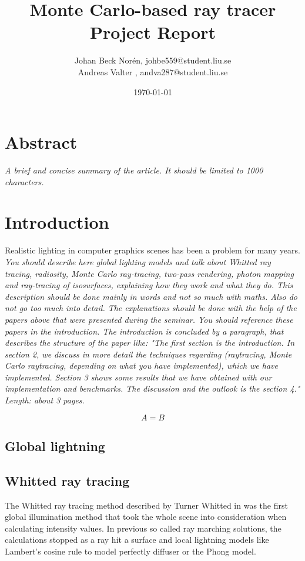 \documentclass[]{report}   %
\begin{document}
\title{Monte Carlo-based ray tracer\\ Project Report}   %
\author{
	Johan Beck Nor\'{e}n, johbe559@student.liu.se
	\\Andreas Valter , andva287@student.liu.se
	}
\date{\today}    %
\maketitle

\setcounter{page}{2}
\chapter{Abstract}
\emph{ A brief and concise summary of the article. It should be limited to 1000 characters.}
\chapter{Introduction}
Realistic lighting in computer graphics scenes has been a problem for many years.
\emph{You should describe here global lighting models and talk about Whitted ray tracing, radiosity, Monte Carlo ray-tracing, two-pass rendering, photon mapping and ray-tracing of isosurfaces, explaining how they work and what they do. 
This description should be done mainly in words and not so much with maths. 
Also do not go too much into detail. 
The explanations should be done with the help of the papers above that were presented during the seminar. 
You should reference these papers in the introduction. 
The introduction is concluded by a paragraph, that describes the structure of the paper like: "The first section is the introduction. 
In section 2, we discuss in more detail the techniques regarding (raytracing, Monte Carlo raytracing, depending on what you have implemented), which we have implemented. 
Section 3 shows some results that we have obtained with our implementation and benchmarks. 
The discussion and the outlook is the section 4." 
Length: about 3 pages.}

\begin{equation} \label{eq:light}
A=B
\end{equation}

\section{Global lightning}


\section{Whitted ray tracing}
The Whitted ray tracing method described by Turner Whitted in \cite{} was the first global illumination method that took the whole scene into consideration when calculating intensity values.
In previous so called ray marching solutions, the calculations stopped as a ray hit a surface and local lightning models like Lambert's cosine rule to model perfectly diffuser or the Phong model. \\
\end{document}
